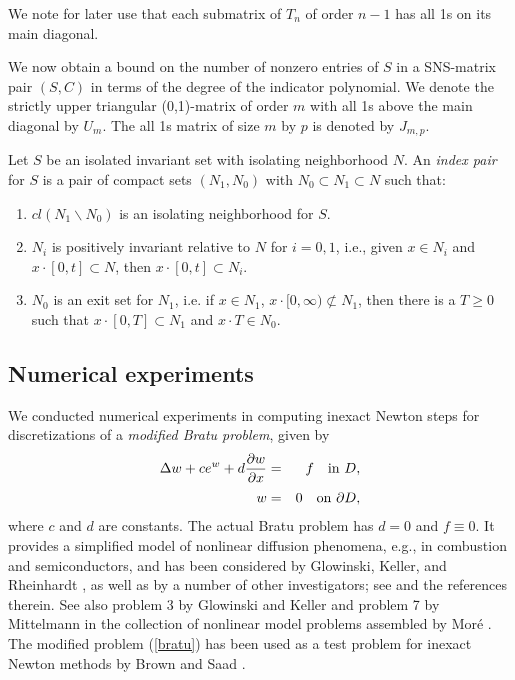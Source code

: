 \documentclass{svk_en}
\begin{document}
We note for later use that each submatrix of $T_{n}$ of
order $n-1$ has all 1s on its main diagonal. 
 
We now obtain a bound on the number of nonzero entries of
$S$ in a SNS-matrix pair $(S,C)$ in terms of the degree of
the indicator polynomial. We denote the strictly upper
triangular (0,1)-matrix of order $m$ with all 1s above the
main diagonal by $U_{m}$. The all 1s matrix of size $m$ by
$p$ is denoted by $J_{m,p}$.
 

\begin{definition}
Let $S$ be an isolated invariant set with isolating neighborhood $N$.
An {\em index pair} for $S$ is a pair of compact sets $(N_{1},N_{0})$
with $N_{0} \subset N_{1} \subset N$ such that:
\begin{enumerate}
\item $cl(N_{1} \backslash N_{0})$
is an isolating neighborhood for $S$.
\item $N_{i}$ is positively invariant relative to $N$ for $i=0,1$,
i.e., given
$x \in N_{i}$ and $x \cdot [0,t] \subset N$, then $x \cdot [0,t] \subset
N_{i}$.
\item $N_{0}$ is an exit set for $N_{1}$, i.e. if $x \in N_{1}$,
$x \cdot [0, \infty ) \not\subset N_{1}$, then there is a $T \geq 0$ such
that $x \cdot [0,T] \subset N_{1}$ and $x \cdot T \in N_{0}$.
\end{enumerate}
\end{definition}

\subsection{Numerical experiments} We conducted numerical experiments 
in computing inexact Newton steps for discretizations of a  
{\em modified Bratu problem}, given by  
\begin{eqnarray} 
{\displaystyle \Delta w + c e^w + d{ {\partial w}\over{\partial x} } } 
&=&{\displaystyle f \quad {\rm in}\ D, }\nonumber\\[-1.5ex]
\label{bratu} \\[-1.5ex]
{\displaystyle w }&=&{\displaystyle 0 \quad {\rm on}\ \partial D , } \nonumber
\end{eqnarray} 
where $c$ and $d$ are constants. The actual Bratu problem has $d=0$ and  
$f \equiv0$. It provides a simplified model of nonlinear diffusion  
phenomena, e.g., in combustion and semiconductors, and has been 
considered by Glowinski, Keller, and Rheinhardt \cite{GloKR85}, 
as well as by a number of other investigators; see \cite{GloKR85} 
and the references therein. See also problem 3 by Glowinski and  Keller  
and problem 7 by Mittelmann in the collection of nonlinear model 
problems assembled by Mor\'e \cite{More}. The modified problem  
(\ref{bratu}) has been used as a test problem for inexact Newton 
methods by Brown and Saad \cite{Brown-Saad1}.  
\end{document}
